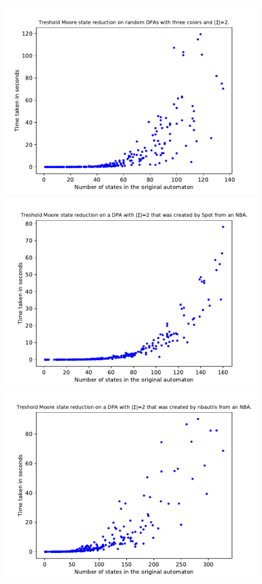 \begin{figure}
	\centering
	\begin{minipage}{0.49\textwidth}
		\includegraphics[page=1,height=.3\textheight]{../data/analysis/threshold_moore/gendet_ap1.pdf} 
		\includegraphics[page=1,height=.3\textheight]{../data/analysis/threshold_moore/detspot_ap1.pdf} 
		\includegraphics[page=1,height=.3\textheight]{../data/analysis/threshold_moore/detnbaut_ap1.pdf} 

\end{minipage}
\end{figure}
